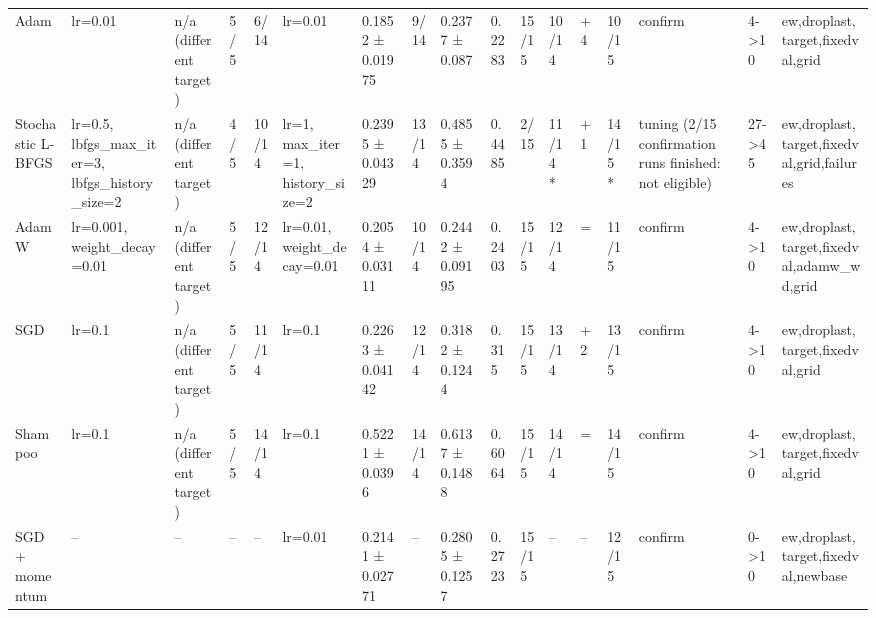 \begin{tabular}{lllllllllllllllll}
Adam & lr=0.01 & n/a (different target) & 5/5 & 6/14 & lr=0.01 & 0.1852 ± 0.01975 & 9/14 & 0.2377 ± 0.087 & 0.2283 & 15/15 & 10/14 & +4 & 10/15 & confirm & 4->10 & ew,droplast,target,fixedval,grid \\
Stochastic L-BFGS & lr=0.5, lbfgs\_max\_iter=3, lbfgs\_history\_size=2 & n/a (different target) & 4/5 & 10/14 & lr=1, max\_iter=1, history\_size=2 & 0.2395 ± 0.04329 & 13/14 & 0.4855 ± 0.3594 & 0.4485 & 2/15 & 11/14 * & +1 & 14/15 * & tuning (2/15 confirmation runs finished: not eligible) & 27->45 & ew,droplast,target,fixedval,grid,failures \\
AdamW & lr=0.001, weight\_decay=0.01 & n/a (different target) & 5/5 & 12/14 & lr=0.01, weight\_decay=0.01 & 0.2054 ± 0.03111 & 10/14 & 0.2442 ± 0.09195 & 0.2403 & 15/15 & 12/14 & = & 11/15 & confirm & 4->10 & ew,droplast,target,fixedval,adamw\_wd,grid \\
SGD & lr=0.1 & n/a (different target) & 5/5 & 11/14 & lr=0.1 & 0.2263 ± 0.04142 & 12/14 & 0.3182 ± 0.1244 & 0.315 & 15/15 & 13/14 & +2 & 13/15 & confirm & 4->10 & ew,droplast,target,fixedval,grid \\
Shampoo & lr=0.1 & n/a (different target) & 5/5 & 14/14 & lr=0.1 & 0.5221 ± 0.0396 & 14/14 & 0.6137 ± 0.1488 & 0.6064 & 15/15 & 14/14 & = & 14/15 & confirm & 4->10 & ew,droplast,target,fixedval,grid \\
SGD + momentum & -- & -- & -- & -- & lr=0.01 & 0.2141 ± 0.02771 & -- & 0.2805 ± 0.1257 & 0.2723 & 15/15 & -- & -- & 12/15 & confirm & 0->10 & ew,droplast,target,fixedval,newbase \\
\bottomrule
\end{tabular}
